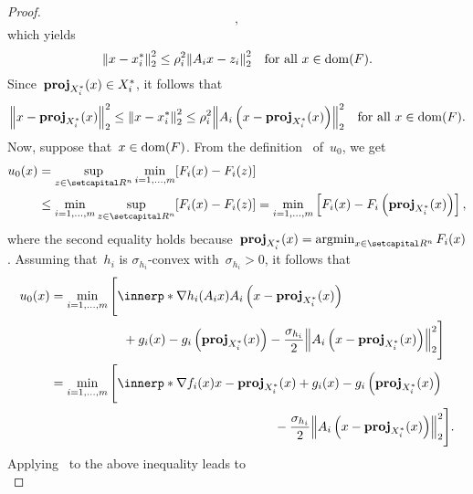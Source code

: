 \documentclass[../main]{subfiles}
\begin{document}
\begin{proof}
\begin{equation}
    ,\end{equation}
    which yields
    \begin{equation}
        \norm*{x - x_i^*}_2^2 \le \rho_i^2 \norm*{A_i x - z_i}_2^2 \forallcondition{x \in \dom(F)}
    .\end{equation}
    Since~$\operatorname{\mathbf{proj}}_{X_i^*}(x) \in X_i^*$, it follows that
    \begin{equation} \label{eq:proximal_PL_MO_sufficient:sc_linear:linear_trans_ineq}
        \norm*{x - \proj_{X_i^*}(x)}_2^2 \le \norm*{x - x_i^*}_2^2 \le \rho_i^2 \norm*{A_i \left(x - \proj_{X_i^*}(x)\right)}_2^2 \forallcondition{x \in \dom(F)}
    .\end{equation}
    Now, suppose that~$x \in \operatorname{dom}(F)$.
    From the definition~ of~$u_0$, we get
    \begin{align}
        u_0(x) &= \sup_{z \in \setR^n} \min_{i = 1, \dots, m} [F_i(x) - F_i(z)] \\
               &\le \min_{i = 1, \dots, m} \sup_{z \in \setR^n} [F_i(x) - F_i(z)] = \min_{i = 1, \dots, m} \left[ F_i(x) - F_i\left( \proj_{X_i^*}(x) \right) \right] 
    ,\end{align}
    where the second equality holds because~$\proj_{X_i^*}(x) = \argmin_{x \in \setR^n} F_i(x)$.
    Assuming that~$h_i$ is $\sigma_{h_i}$-convex with~$\sigma_{h_i} > 0$, it follows that
    \begin{align}
        u_0(x) &= \min_{i = 1, \dots, m}
        \begin{multlined}[t] \Biggl[ 
                \innerp*{\nabla h_i(A_i x)}{A_i \left(x - \proj_{X_i^*}(x)\right)} \\
                + g_i(x) - g_i\left( \proj_{X_i^*}(x) \right) - \frac{\sigma_{h_i}}{2} \norm*{A_i\left( x - \proj_{X_i^*}(x) \right) }_2^2 \Biggr] 
            \end{multlined} \\
               &= \min_{i = 1, \dots, m} 
               \begin{multlined}[t]
               \Biggl[ \innerp*{\nabla f_i(x)}{x - \proj_{X_i^*}(x)} + g_i(x) - g_i\left( \proj_{X_i^*}(x) \right) \\
               - \frac{\sigma_{h_i}}{2} \norm*{A_i \left( x - \proj_{X_i^*}(x) \right) }_2^2 \Biggr] 
               .\end{multlined}
    \end{align}
    Applying~ to the above inequality leads to
    \begin{equation}

\end{equation}
\end{proof}
\end{document}
